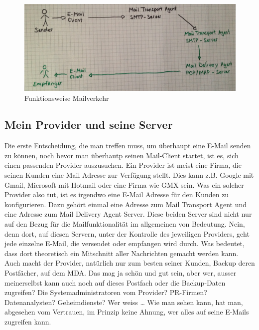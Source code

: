 \begin{figure}
\centering
\noindent\includegraphics[scale=0.14]{images/mailverkehr.jpg}
\caption{Funktionsweise Mailverkehr}
\end{figure}


\subsection{Mein Provider und seine Server}
Die erste Entscheidung, die man treffen muss, um überhaupt eine E-Mail senden zu können, noch bevor man überhautp seinen Mail-Client startet, ist es, sich einen passenden Provider auszusuchen. Ein Provider ist meist eine Firma, die seinen Kunden eine Mail Adresse zur Verfügung stellt. Dies kann z.B. Google mit Gmail, Microsoft mit Hotmail oder eine Firma wie GMX sein. Was ein solcher Provider also tut, ist es irgendwo eine E-Mail Adresse für den Kunden zu konfigurieren. Dazu gehört einmal eine Adresse zum Mail Transport Agent und eine Adresse zum Mail Delivery Agent Server.
Diese beiden Server sind nicht nur auf den Bezug für die Mailfunktionalität im allgemeinen von Bedeutung. Nein, denn dort, auf diesen Servern, unter der Kontrolle des jeweiligen Providers, geht jede einzelne E-Mail, die versendet oder empfangen wird durch. Was bedeutet, dass dort theoretisch ein Mitschnitt aller Nachrichten gemacht werden kann. Auch macht der Provider, natürlich nur zum besten seiner Kunden, Backup deren Postfächer, auf dem MDA. Das mag ja schön und gut sein, aber wer, ausser meinerselbst kann auch noch auf dieses Postfach oder die Backup-Daten zugreifen? Die Systemadministratoren vom Provider? PR-Firmen? Datenanalysten? Geheimdienste? Wer weiss …
Wie man sehen kann, hat man, abgesehen vom Vertrauen, im Prinzip keine Ahnung, wer alles auf seine E-Mails zugreifen kann.
